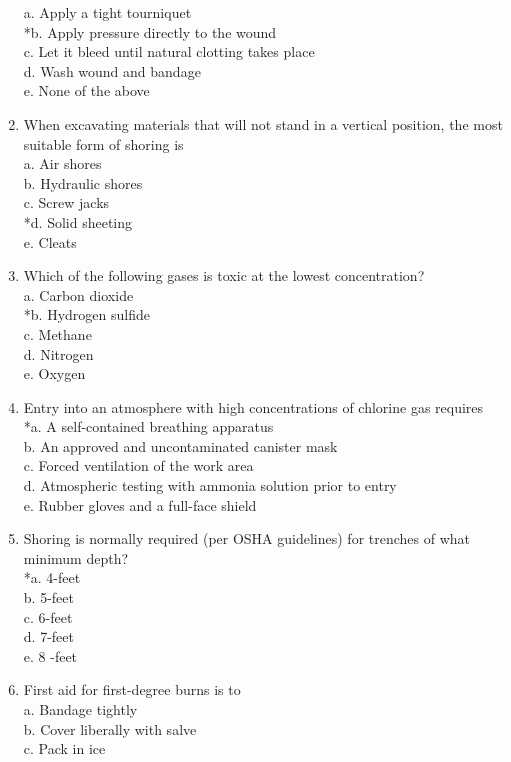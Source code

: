 \begin{enumerate}[1.]
a. Apply a tight tourniquet\\
*b. Apply pressure directly to the wound\\
c. Let it bleed until natural clotting takes place\\
d. Wash wound and bandage\\
e. None of the above\\
\item When excavating materials that will not stand in a vertical position, the most suitable form of shoring is\\
a. Air shores\\
b. Hydraulic shores\\
c. Screw jacks\\
*d. Solid sheeting\\
e. Cleats\\
\item Which of the following gases is toxic at the lowest concentration?\\
a. Carbon dioxide\\
*b. Hydrogen sulfide\\
c. Methane\\
d. Nitrogen\\
e. Oxygen\\
\item Entry into an atmosphere with high concentrations of chlorine gas requires\\
*a. A self-contained breathing apparatus\\
b. An approved and uncontaminated canister mask\\
c. Forced ventilation of the work area\\
d. Atmospheric testing with ammonia solution prior to entry\\
e. Rubber gloves and a full-face shield\\
\item Shoring is normally required (per OSHA guidelines) for trenches of what minimum depth?\\
*a. 4-feet\\
b. 5-feet\\
c. 6-feet\\
d. 7-feet\\
e. 8 -feet\\
\item First aid for first-degree burns is to\\
a. Bandage tightly\\
b. Cover liberally with salve\\
c. Pack in ice\\

\end{enumerate}
